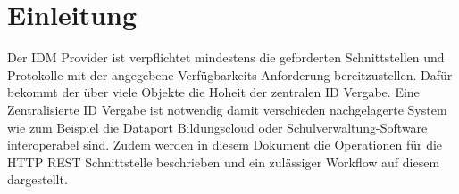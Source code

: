 \chapter{Einleitung}
Der IDM Provider ist verpflichtet mindestens die geforderten Schnittstellen und Protokolle mit der angegebene Verfügbarkeits-Anforderung bereitzustellen.
Dafür bekommt der über viele Objekte die Hoheit der zentralen ID Vergabe.
Eine Zentralisierte ID Vergabe ist notwendig damit verschieden nachgelagerte System wie zum Beispiel die Dataport Bildungscloud oder Schulverwaltung-Software interoperabel sind.
Zudem werden in diesem Dokument die Operationen für die HTTP REST Schnittstelle beschrieben und ein zulässiger Workflow auf diesem dargestellt.

